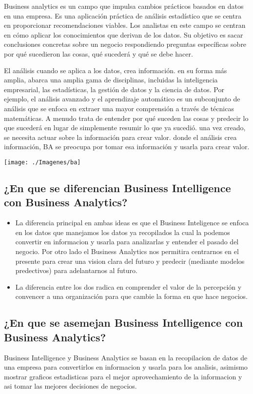 \documentclass[twoside,twocolumn]{article}
\begin{document}
Business analytics es un campo que impulsa cambios prácticos basados en datos en una empresa. Es una aplicación práctica de análisis estadístico que se centra en proporcionar recomendaciones viables. Los analistas en este campo se centran en cómo aplicar los conocimientos que derivan de los datos. Su objetivo es sacar conclusiones concretas sobre un negocio respondiendo preguntas específicas sobre por qué sucedieron las cosas, qué sucederá y qué se debe hacer.
 
El análisis cuando se aplica a los datos, crea información. en su forma más amplia, abarca una amplia gama de disciplinas, incluidas la inteligencia empresarial, las estadísticas, la gestión de datos y la ciencia de datos. Por ejemplo, el análisis avanzado y el aprendizaje automático es un subconjunto de análisis que se enfoca en extraer una mayor comprensión a través de técnicas matemáticas. A menudo trata de entender por qué suceden las cosas y predecir lo que sucederá en lugar de simplemente resumir lo que ya sucedió. una vez creado, se necesita actuar sobre la información para crear valor. donde el análisis crea información, BA se preocupa por tomar esa información y usarla para crear valor.

\begin{center}
	\texttt{[image: ./Imagenes/ba]} 
\end{center}

\subsection{¿En que se diferencian Business Intelligence con Business Analytics?}
\begin{itemize}	
	\item La diferencia principal en ambas ideas es que el Business Inteligence se enfoca en los datos que manejamos los datos ya recopilados la cual la podemos convertir en informacion y usarla para analizarlas y entender el pasado del negocio. Por otro lado el Business Analytics nos permitira centrarnos en el presente para crear una vision clara del futuro y predecir (mediante modelos predectivos) para adelantarnos al futuro.
	\item La  diferencia entre los dos radica en comprender el valor de la percepción y convencer a una organización para que cambie la forma en que hace negocios.
\end{itemize} 





\subsection{¿En que se asemejan Business Intelligence con Business Analytics?}
Business Intelligence y Business Analytics se basan en la recopilacion de datos de una empresa para convertirlos en informacion y usarla para los analisis, asimismo mostrar graficos estadisticas para el mejor aprovechamiento de la informacion y asi tomar las mejores decisiones de negocios.
\end{document}
